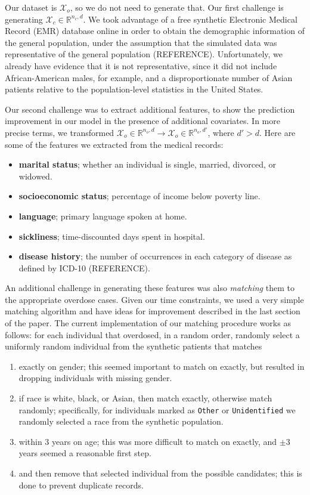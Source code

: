 \documentclass{article}
\begin{document}
Our dataset is $\mathcal{X}_o$, so we do not need to generate that. Our first challenge is generating $\mathcal{X}_c \in \mathbb{R}^{n_c,d}$. We took advantage of a free synthetic Electronic Medical Record (EMR) database online in order to obtain the demographic information of the general population, under the assumption that the simulated data was representative of the general population (REFERENCE). Unfortunately, we already have evidence that it is not representative, since it did not include African-American males, for example, and a disproportionate number of Asian patients relative to the population-level statistics in the United States.

Our second challenge was to extract additional features, to show the prediction improvement in our model in the presence of additional covariates. In more precise terms, we transformed $\mathcal{X}_o \in \mathbb{R}^{n_o,d} \to \mathcal{X}_o \in \mathbb{R}^{n_o,d'}$, where $d' > d$. Here are some of the features we extracted from the medical records:
\begin{itemize}
\item {\bf marital status}; whether an individual is single, married, divorced, or widowed.
\item {\bf socioeconomic status}; percentage of income below poverty line.
\item {\bf language}; primary language spoken at home.
\item {\bf sickliness}; time-discounted days spent in hospital.
\item {\bf disease history}; the number of occurrences in each category of disease as defined by ICD-10 (REFERENCE).
\end{itemize}
An additional challenge in generating these features was also {\it matching} them to the appropriate overdose cases. Given our time constraints, we used a very simple matching algorithm and have ideas for improvement described in the last section of the paper. The current implementation of our matching procedure works as follows: for each individual that overdosed, in a random order, randomly select a uniformly random individual from the synthetic patients that matches
\begin{enumerate}
\item exactly on gender; this seemed important to match on exactly, but resulted in dropping individuals with missing gender.
\item if race is white, black, or Asian, then match exactly, otherwise match randomly; specifically, for individuals marked as \texttt{Other} or \texttt{Unidentified} we randomly selected a race from the synthetic population.
\item within 3 years on age; this was more difficult to match on exactly, and $\pm$3 years seemed a reasonable first step.
\item and then remove that selected individual from the possible candidates; this is done to prevent duplicate records.
\end{enumerate}
\end{document}
